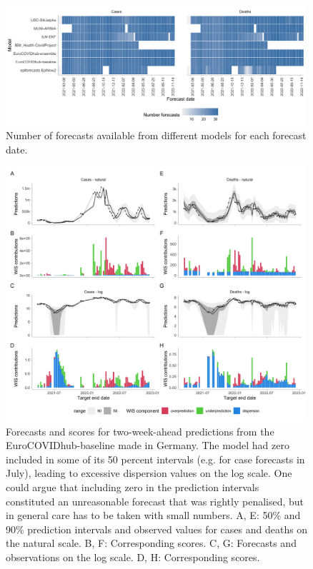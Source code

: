 \documentclass{article}
\begin{document}
\begin{figure}[h!]
    \centering
    \includegraphics[width=0.99\textwidth]{output/figures/number-avail-forecasts.png}
    \caption{
    Number of forecasts available from different models for each forecast date. 
    }
    \label{fig:HUB-num-avail-models}
\end{figure}


\begin{figure}[h!]
    \centering
    \includegraphics[width=0.99\textwidth]{output/figures/HUB-model-comparison-baseline.png}
    \caption{
    Forecasts and scores for two-week-ahead predictions from the EuroCOVIDhub-baseline made in Germany. The model had zero included in some of its 50 percent intervals (e.g. for case forecasts in July), leading to excessive dispersion values on the log scale. One could argue that including zero in the prediction intervals constituted an unreasonable forecast that was rightly penalised, but in general care has to be taken with small numbers. A, E: 50\% and 90\% prediction intervals and observed values for cases and deaths on the natural scale. B, F: Corresponding scores. C, G: Forecasts and observations on the log scale. D, H: Corresponding scores. 
    }
    \label{fig:HUB-model-comparison-baseline}
\end{figure}
\end{document}
